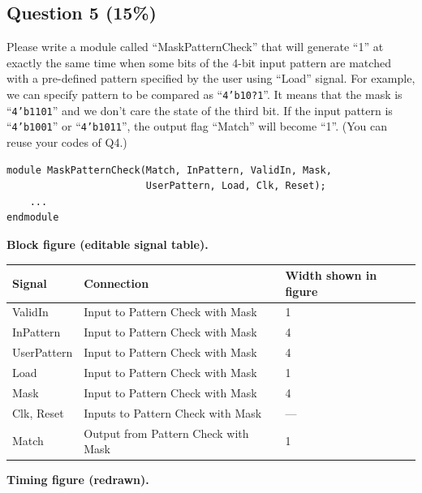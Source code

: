 \documentclass[11pt,a4paper]{article}
\newcommand{\question}[2]{\subsection*{Question #1 \hfill (#2\%)}}
\newcommand{\signal}[1]{\texttt{#1}}
\newcommand{\bus}[3]{%
  \draw (#2,#1)--({#2+.13},{#1+.17})--({#2+.87},{#1+.17})--({#2+1},#1)
    --({#2+.87},{#1-.17})--({#2+.13},{#1-.17})--cycle;
  \node[font=\scriptsize] at ({#2+.5},#1) {#3};}
\newcommand{\clockrow}[2]{%
  \node[anchor=east,font=\small] at (-.2,#1) {Clk};
  \foreach \i in {0,...,#2} {
    \draw (\i,#1)--(\i,{#1+.3})--({\i+.5},{#1+.3})--({\i+.5},#1)--({\i+1},#1);}}
\begin{document}
\question{5}{15}
Please write a module called ``MaskPatternCheck'' that will generate ``1''
at exactly the same time when some bits of the 4-bit input pattern are
matched with a pre-defined pattern specified by the user using ``Load''
signal. For example, we can specify pattern to be compared as
``\signal{4'b10?1}''. It means that the mask is ``\signal{4'b1101}'' and
we don't care the state of the third bit. If the input pattern is
``\signal{4'b1001}'' or ``\signal{4'b1011}'', the output flag ``Match''
will become ``1''. (You can reuse your codes of Q4.)
\begin{verbatim}
module MaskPatternCheck(Match, InPattern, ValidIn, Mask,
                        UserPattern, Load, Clk, Reset);
    ...
endmodule
\end{verbatim}
\textbf{Block figure (editable signal table).}
\begin{center}
\begin{tabular}{lll}\toprule
Signal & Connection & Width shown in figure\\\midrule
ValidIn & Input to Pattern Check with Mask & 1\\
InPattern & Input to Pattern Check with Mask & 4\\
UserPattern & Input to Pattern Check with Mask & 4\\
Load & Input to Pattern Check with Mask & 1\\
Mask & Input to Pattern Check with Mask & 4\\
Clk, Reset & Inputs to Pattern Check with Mask & ---\\
Match & Output from Pattern Check with Mask & 1\\\bottomrule
\end{tabular}
\end{center}
\textbf{Timing figure (redrawn).}
\begin{center}
\end{center}
\end{document}
